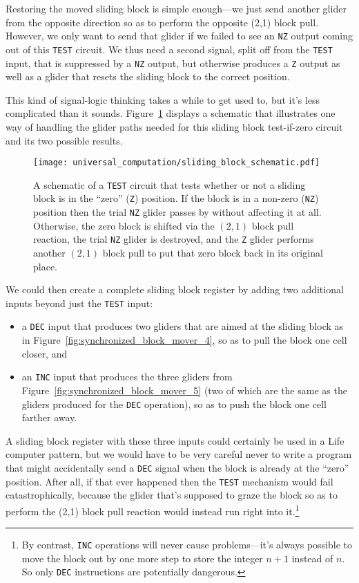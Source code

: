 Restoring the moved sliding block is simple enough---we just send another glider from the opposite direction so as to perform the opposite (2,1) block pull. However, we only want to send that glider if we failed to see an \texttt{NZ} output coming out of this \texttt{TEST} circuit. We thus need a second signal, split off from the \texttt{TEST} input, that is suppressed by a \texttt{NZ} output, but otherwise produces a \texttt{Z} output as well as a glider that resets the sliding block to the correct position.

This kind of signal-logic thinking takes a while to get used to, but it's less complicated than it sounds. Figure~\ref{fig:sliding_block_schematic} displays a schematic that illustrates one way of handling the glider paths needed for this sliding block test-if-zero circuit and its two possible results.

\begin{figure}[!htb]
	\centering
	\texttt{[image: universal\_computation/sliding\_block\_schematic.pdf]}
	\caption{A schematic of a \texttt{TEST} circuit that tests whether or not a sliding block is in the ``zero'' (\texttt{Z}) position. If the block is in a non-zero (\texttt{NZ}) position then the trial \texttt{NZ} glider passes by without affecting it at all. Otherwise, the zero block is shifted via the $(2,1)$ block pull reaction, the trial \texttt{NZ} glider is destroyed, and the \texttt{Z} glider performs another $(2,1)$ block pull to put that zero block back in its original place.}\label{fig:sliding_block_schematic}
\end{figure}

We could then create a complete sliding block register by adding two additional inputs beyond just the \texttt{TEST} input:\smallskip

\begin{itemize}
	\item a \texttt{DEC} input that produces two gliders that are aimed at the sliding block as in Figure~\ref{fig:synchronized_block_mover_4}, so as to pull the block one cell closer, and\smallskip
	
	\item an \texttt{INC} input that produces the three gliders from Figure~\ref{fig:synchronized_block_mover_5} (two of which are the same as the gliders produced for the \texttt{DEC} operation), so as to push the block one cell farther away.\smallskip
\end{itemize}

A sliding block register with these three inputs could certainly be used in a Life computer pattern, but we would have to be very careful never to write a program that might accidentally send a \texttt{DEC} signal when the block is already at the ``zero'' position. After all, if that ever happened then the \texttt{TEST} mechanism would fail catastrophically, because the glider that's supposed to graze the block so as to perform the (2,1) block pull reaction would instead run right into it.\footnote{By contrast, \texttt{INC} operations will never cause problems---it's always possible to move the block out by one more step to store the integer $n+1$ instead of $n$. So only \texttt{DEC} instructions are potentially dangerous.}

